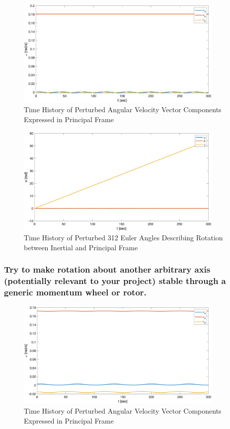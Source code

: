 \begin{figure}[H]
    \centering
    \captionsetup{ justification = centering}
    \includegraphics[width = 10cm]{Images/PS4/mom_wheel_intermediate_stability_history_velocity.png}
    \caption{Time History of Perturbed Angular Velocity Vector Components Expressed in Principal Frame}
    \label{fig:mom_wheel_intermediate_stability_velocities}
\end{figure}

\begin{figure}[H]
    \centering
    \captionsetup{justification = centering}
    \includegraphics[width = 10cm]{Images/PS4/mom_wheel_intermediate_stability_history_angles.png}
    \caption{Time History of Perturbed 312 Euler Angles Describing Rotation between Inertial and Principal Frame}
    \label{fig:mom_wheel_inermediate_stability_angles}
\end{figure}

\subsubsection{Try to make rotation about another arbitrary axis (potentially relevant to your project) stable
through a generic momentum wheel or rotor.}

\begin{figure}[H]
    \centering
    \captionsetup{ justification = centering}
    \includegraphics[width = 10cm]{Images/PS4/mom_wheel_mission_stability_history_velocity.png}
    \caption{Time History of Perturbed Angular Velocity Vector Components Expressed in Principal Frame}
    \label{fig:mom_wheel_mission_stability_velocities}
\end{figure}

